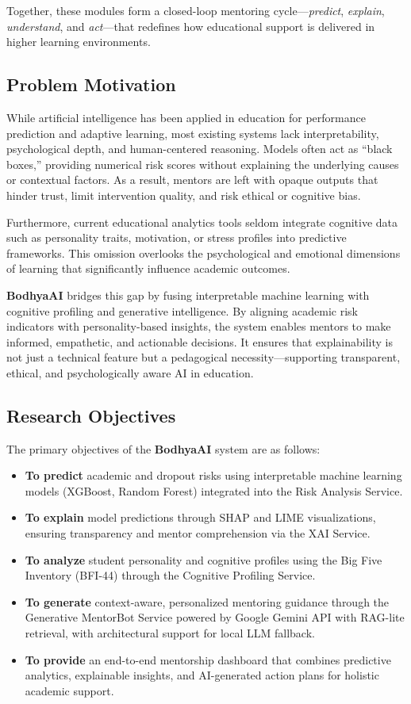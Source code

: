 \documentclass[conference]{IEEEtran}
\begin{document}
Together, these modules form a closed-loop mentoring cycle—\textit{predict}, \textit{explain}, \textit{understand}, and \textit{act}—that redefines how educational support is delivered in higher learning environments.

\subsection{Problem Motivation}
While artificial intelligence has been applied in education for performance prediction and adaptive learning, most existing systems lack interpretability, psychological depth, and human-centered reasoning. Models often act as ``black boxes,'' providing numerical risk scores without explaining the underlying causes or contextual factors. As a result, mentors are left with opaque outputs that hinder trust, limit intervention quality, and risk ethical or cognitive bias.  

Furthermore, current educational analytics tools seldom integrate cognitive data such as personality traits, motivation, or stress profiles into predictive frameworks. This omission overlooks the psychological and emotional dimensions of learning that significantly influence academic outcomes.  

\textbf{BodhyaAI} bridges this gap by fusing interpretable machine learning with cognitive profiling and generative intelligence. By aligning academic risk indicators with personality-based insights, the system enables mentors to make informed, empathetic, and actionable decisions. It ensures that explainability is not just a technical feature but a pedagogical necessity—supporting transparent, ethical, and psychologically aware AI in education.

\subsection{Research Objectives}
The primary objectives of the \textbf{BodhyaAI} system are as follows:
\begin{itemize}
    \item \textbf{To predict} academic and dropout risks using interpretable machine learning models (XGBoost, Random Forest) integrated into the Risk Analysis Service.
    \item \textbf{To explain} model predictions through SHAP and LIME visualizations, ensuring transparency and mentor comprehension via the XAI Service.
    \item \textbf{To analyze} student personality and cognitive profiles using the Big Five Inventory (BFI-44) through the Cognitive Profiling Service.
    \item \textbf{To generate} context-aware, personalized mentoring guidance through the Generative MentorBot Service powered by Google Gemini API with RAG-lite retrieval, with architectural support for local LLM fallback.
    \item \textbf{To provide} an end-to-end mentorship dashboard that combines predictive analytics, explainable insights, and AI-generated action plans for holistic academic support.
\end{itemize}
\end{document}
